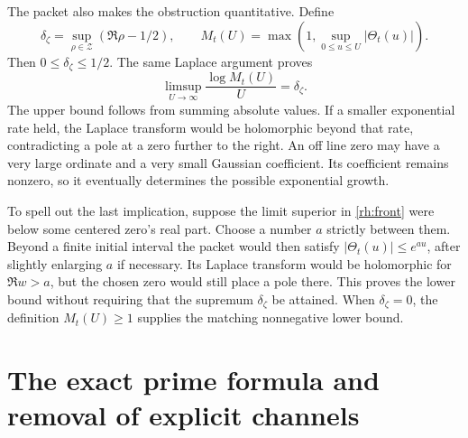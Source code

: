 The packet also makes the obstruction quantitative. Define
\begin{equation}\label{rh:delta}
\delta_\zeta=\sup_{\rho\in\mathcal Z}(\Re\rho-1/2),
\qquad
M_t(U)=\max\left(1,\sup_{0\le u\le U}|\Theta_t(u)|\right).
\end{equation}
Then \(0\le\delta_\zeta\le1/2\). The same Laplace argument proves
\begin{equation}\label{rh:front}
\limsup_{U\to\infty}\frac{\log M_t(U)}{U}=\delta_\zeta.
\end{equation}
The upper bound follows from summing absolute values. If a smaller exponential rate held, the Laplace transform would be holomorphic beyond that rate, contradicting a pole at a zero further to the right. An off line zero may have a very large ordinate and a very small Gaussian coefficient. Its coefficient remains nonzero, so it eventually determines the possible exponential growth.

To spell out the last implication, suppose the limit superior in \eqref{rh:front} were below some centered zero's real part. Choose a number \(a\) strictly between them. Beyond a finite initial interval the packet would then satisfy \(|\Theta_t(u)|\le e^{au}\), after slightly enlarging \(a\) if necessary. Its Laplace transform would be holomorphic for \(\Re w>a\), but the chosen zero would still place a pole there. This proves the lower bound without requiring that the supremum \(\delta_\zeta\) be attained. When \(\delta_\zeta=0\), the definition \(M_t(U)\ge1\) supplies the matching nonnegative lower bound.


\section{The exact prime formula and removal of explicit channels}

